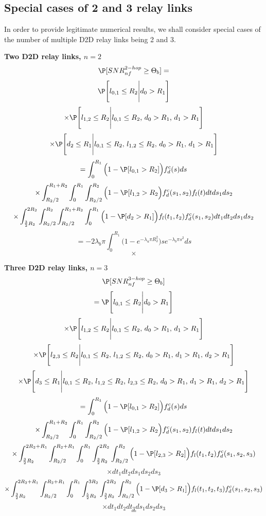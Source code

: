 \subsection {Special cases of 2 and 3 relay links}
\par In order to provide legitimate numerical results, we shall consider special cases of the number of multiple D2D relay links being 2 and 3.
\par{\bf Two D2D relay links, \(n=2\)}
\[\P[SNR^{2-hop}_{nf}\ge\Theta_b]=\]
\[\P\Bigg[l_{0,1}\le R_2\Bigg|d_0>R_1\Bigg]\]
\[\times\P\Bigg[l_{1,2}\le R_2\Bigg|l_{0,1}\le R_2\text{, }d_0>R_1\text{, }d_1>R_1\Bigg]\]
\[\times\P\Bigg[d_2\le R_1\Bigg|l_{0,1}\le R_2\text{, }l_{1,2}\le R_2\text{, }d_0>R_1\text{, }d_1>R_1\Bigg]\]
\[=\int_{0}^{R_1}\Big(1-\P[l_{0,1}>R_2]\Big)f^c_d(s)ds\]
\[\times\int_{R_2/2}^{R_1+R_2}\int_{0}^{R_1}\int_{R_2/2}^{R_2}\Big(1-\P[l_{1,2}>R_2\Big)f^c_d(s_1,s_2)f_l(t)dtds_1ds_2\]
\[\times\int_{\frac{3}{2}R_2}^{2R_2}\int_{R_2/2}^{R_2}\int_{R_2/2}^{R_1+R_2}\int_{0}^{R_1}\Big(1-\P[d_2>R_1]\Big)f_l(t_1,t_2)f^c_d(s_1,s_2)dt_1dt_2ds_1ds_2\]
\[=-2\lambda_b\pi\int_{0}^{R_1}\Big(1-e^{-\lambda_u\pi R_2^2}\Big)se^{-\lambda_b\pi s^2}ds\]
\[\times\]

\par{\bf Three D2D relay links, \(n=3\)}
\[\P[SNR^{3-hop}_{nf}\ge\Theta_b]\]
\[=\P\Bigg[l_{0,1}\le R_2\Bigg|d_0>R_1\Bigg]\]
\[\times\P\Bigg[l_{1,2}\le R_2\Bigg|l_{0,1}\le R_2\text{, }d_0>R_1\text{, }d_1>R_1\Bigg]\]
\[\times\P\Bigg[l_{2,3}\le R_2\Bigg|l_{0,1}\le R_2\text{, }l_{1,2}\le R_2\text{, }d_0>R_1\text{, }d_1>R_1\text{, }d_2>R_1\Bigg]\]
\[\times\P\Bigg[d_3\le R_1\Bigg|l_{0,1}\le R_2\text{, }l_{1,2}\le R_2\text{, }l_{2,3}\le R_2\text{, }d_0>R_1\text{, }d_1>R_1\text{, }d_2>R_1\Bigg]\]
\[=\int_{0}^{R_1}\Big(1-\P[l_{0,1}>R_2]\Big)f^c_d(s)ds\]
\[\times\int_{R_2/2}^{R_1+R_2}\int_{0}^{R_1}\int_{R_2/2}^{R_2}\Big(1-\P[l_{1,2}>R_2\Big)f^c_d(s_1,s_2)f_l(t)dtds_1ds_2\]
\[\times\int_{\frac{3}{2}R_2}^{2R_2+R_1}\int_{R_2/2}^{R_2+R_1}\int_{0}^{R_1}\int_{\frac{3}{2}R_2}^{2R_2}\int_{R_2/2}^{R_2}\Big(1-\P[l_{2,3}>R_2]\Big)f_l(t_1,t_2)f^c_d(s_1,s_2,s_3)\]
\[\times dt_1dt_2ds_1ds_2ds_3\]
\[\times\int_{\frac{3}{2}R_2}^{2R_2+R_1}\int_{R_2/2}^{R_2+R_1}\int_{0}^{R_1}\int_{\frac{5}{2}R_2}^{3R_2}\int_{\frac{3}{2}R_2}^{2R_2}\int_{R_2/2}^{R_2}\Big(1-\P[d_3>R_1]\Big)f_l(t_1,t_2,t_3)f^c_d(s_1,s_2,s_3)\]
\[\times dt_1dt_2dt_3ds_1ds_2ds_3\]
\[=\]
